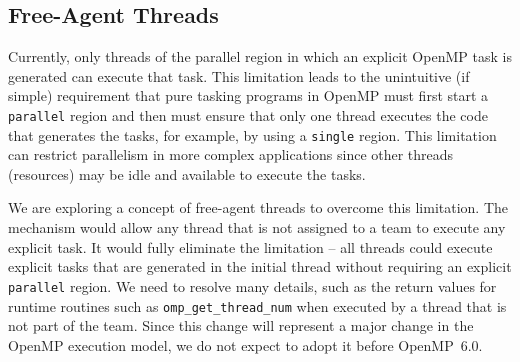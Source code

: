 \subsection{Free-Agent Threads}
\label{sub:task_only_threads}


Currently, only threads of the parallel region in which an explicit
OpenMP task is generated can execute that task. This limitation leads
to the unintuitive (if simple) requirement that pure tasking programs 
in OpenMP must first start a \texttt{parallel} region and then must 
ensure that only one thread executes the code that generates the tasks, 
for example, by using a \texttt{single} region. This limitation can 
restrict parallelism in more complex applications since other threads 
(resources) may be idle and available to execute the tasks.

We are exploring a concept of free-agent threads to overcome this 
limitation. The mechanism would allow any thread that is not assigned
to a team to execute any explicit task. It would fully eliminate the
limitation -- all threads could execute explicit tasks that are 
generated in the initial thread without requiring an explicit 
\texttt{parallel} region. We need to resolve many details, such as
the return values for runtime routines such as \texttt{omp\_get\_thread\_num}
when executed by a thread that is not part of the team. Since this change 
will represent a major change in the OpenMP execution model, we do not 
expect to adopt it before OpenMP~6.0.




